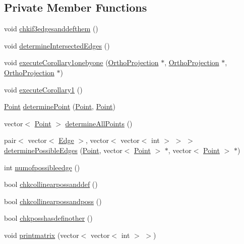 \subsection*{Private Member Functions}
\begin{DoxyCompactItemize}
\item 
void \hyperlink{class_projection2_d_a64751fc8527786d489d3e1f9dd613778}{chkif3edgesanddefthem} ()
\item 
void \hyperlink{class_projection2_d_a6be4ef41d013628ba91a3f1dbcc1f9bf}{determine\+Intersected\+Edges} ()
\item 
void \hyperlink{class_projection2_d_af65b18c0f1aed2c6bda79173ef6a0f5e}{execute\+Corollary1onebyone} (\hyperlink{class_ortho_projection}{Ortho\+Projection} $\ast$, \hyperlink{class_ortho_projection}{Ortho\+Projection} $\ast$, \hyperlink{class_ortho_projection}{Ortho\+Projection} $\ast$)
\item 
void \hyperlink{class_projection2_d_a7433a1a25a81f16a79c308d5dd7d98b5}{execute\+Corollary1} ()
\item 
\hyperlink{class_point}{Point} \hyperlink{class_projection2_d_a0185949b0711aa0a43bd2f66da9aaee7}{determine\+Point} (\hyperlink{class_point}{Point}, \hyperlink{class_point}{Point})
\item 
vector$<$ \hyperlink{class_point}{Point} $>$ \hyperlink{class_projection2_d_af2972a56d0f0fa6a9d01576d7021180d}{determine\+All\+Points} ()
\item 
pair$<$ vector$<$ \hyperlink{class_edge}{Edge} $>$, vector$<$ vector$<$ int $>$ $>$ $>$ \hyperlink{class_projection2_d_ad5f6fe26ce1a18cb5de2fe87e6b0869e}{determine\+Possible\+Edges} (\hyperlink{class_point}{Point}, vector$<$ \hyperlink{class_point}{Point} $>$ $\ast$, vector$<$ \hyperlink{class_point}{Point} $>$ $\ast$)
\item 
int \hyperlink{class_projection2_d_ad277ae374c9340f41f821e3b23aa6c04}{numofpossibleedge} ()
\item 
bool \hyperlink{class_projection2_d_af9a959f2c44a1801687dda170ba0d5d2}{chkcollinearpossanddef} ()
\item 
bool \hyperlink{class_projection2_d_a26179e263ee8be9bfbc260bedaea14c7}{chkcollinearpossandposs} ()
\item 
bool \hyperlink{class_projection2_d_a7b26c1f31633d19a33bdf54e8c47d3d8}{chkposshasdefinother} ()
\item 
void \hyperlink{class_projection2_d_a209abc191321c5bdd970c57c68dd0ac8}{printmatrix} (vector$<$ vector$<$ int $>$ $>$)
\item 

\end{DoxyCompactItemize}
